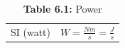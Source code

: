 \documentclass[
  letterpaper,
  DIV=11,
  numbers=noendperiod]{scrreprt}
\theoremstyle{definition}
\theoremstyle{remark}
\begin{document}
\begin{longtable}[]{@{}
  >{\raggedright\arraybackslash}p{}
  >{\raggedright\arraybackslash}p{}@{}}
\caption{\textbf{Table 6.1:} Power}\tabularnewline
\toprule\noalign{}
\endfirsthead
\endhead
\bottomrule\noalign{}
\endlastfoot
SI (watt) &
\(                                                                                                                                                                                                                                                                                                                                                                                                                                                                                                                                                                                                                                                                                                                                                                                                                              
                                                                                                                                                                                                                                                                                                                                                                                                                                                                                                                                                                                                                                                                                                                  W=\frac{N m}{s}=\frac{J}{s}                                                                                                           
                                                                                                                                                                                                                                                                                                                                                                                                                                                                                                                                                                                                                                                                                                                  \) \\

\end{longtable}
\end{document}
